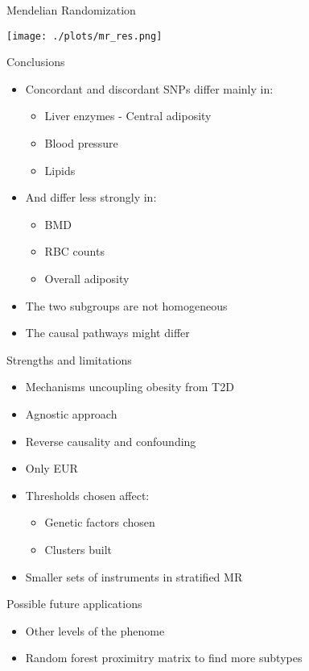 \documentclass[presentation]{beamer}
\begin{document}
\begin{frame}[label={sec:org945cb9c}]{Mendelian Randomization}
\begin{center}
\texttt{[image: ./plots/mr\_res.png]}
\end{center}
\end{frame}
\begin{frame}[label={sec:orge459bbf}]{Conclusions}
\begin{itemize}
\item Concordant and discordant SNPs differ mainly in:
\begin{itemize}
\item Liver enzymes - Central adiposity
\item Blood pressure
\item Lipids
\end{itemize}
\item And differ less strongly in:
\begin{itemize}
\item BMD
\item RBC counts
\item Overall adiposity
\end{itemize}
\item The two subgroups are not homogeneous
\item The causal pathways might differ
\end{itemize}
\end{frame}
\begin{frame}[label={sec:org1d93762}]{Strengths and limitations}
\begin{itemize}
\item Mechanisms uncoupling obesity from T2D
\item Agnostic approach
\item Reverse causality and confounding
\item Only EUR
\item Thresholds chosen affect:
\begin{itemize}
\item Genetic factors chosen
\item Clusters built
\end{itemize}
\item Smaller sets of instruments in stratified MR
\end{itemize}
\end{frame}
\begin{frame}[label={sec:org2ad2fda}]{Possible future applications}
\begin{itemize}
\item Other levels of the phenome
\item Random forest proximitry matrix to find more subtypes
\end{itemize}
\end{frame}
\end{document}
